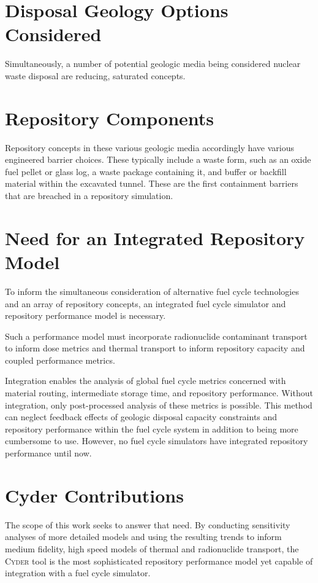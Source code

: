 \documentclass[letterpaper]{article}
\newcommand{\Cyder}{\textsc{Cyder}\xspace}
\begin{document}
\section{Disposal Geology Options Considered}

Simultaneously, a number of potential geologic media being considered nuclear 
waste disposal are reducing, saturated concepts.

\section{Repository Components}

Repository concepts in these various geologic media accordingly have various 
engineered barrier choices. These typically include a waste form, such as an 
oxide fuel pellet or glass log, a waste package containing it, and buffer or 
backfill material within the excavated tunnel. These are the first containment 
barriers that are breached in a repository simulation.

\section{Need for an Integrated Repository Model}

To inform the simultaneous consideration of alternative fuel cycle technologies 
and an array of repository concepts, an integrated fuel cycle simulator and 
repository performance model is necessary.

Such a performance model must incorporate radionuclide contaminant transport to 
inform dose metrics and thermal transport to inform repository capacity and 
coupled performance metrics.

Integration enables the analysis of global fuel cycle metrics concerned with 
material routing, intermediate storage time, and repository performance.  
Without integration, only post-processed analysis of these metrics is possible. 
This method can neglect feedback effects of geologic disposal capacity 
constraints and repository performance within the fuel cycle system in addition 
to being more cumbersome to use. However, no fuel cycle simulators have 
integrated repository performance until now. 

\section{Cyder Contributions}

The scope of this work seeks to answer that need. By conducting sensitivity 
analyses of more detailed models and using the resulting trends to inform  
medium fidelity, high speed models of thermal and radionuclide transport, the 
\Cyder tool is the most sophisticated repository performance model yet capable 
of integration with a fuel cycle simulator.
\end{document}
